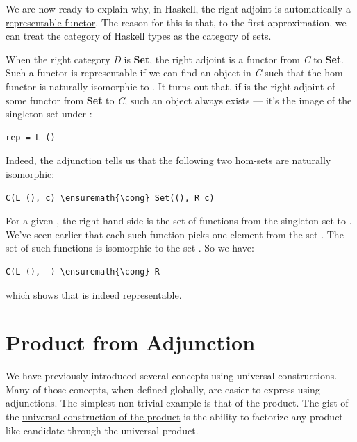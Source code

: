 We are now ready to explain why, in Haskell, the right adjoint is
automatically a \hyperref[chap-representable-functors]{representable
functor}. The reason for this is that, to the first approximation, we
can treat the category of Haskell types as the category of sets.

When the right category \emph{D} is \textbf{Set}, the right adjoint
 is a functor from \emph{C} to \textbf{Set}. Such a functor is
representable if we can find an object  in \emph{C} such
that the hom-functor  is naturally isomorphic to
. It turns out that, if  is the right adjoint of
some functor  from \textbf{Set} to \emph{C}, such an object
always exists --- it's the image of the singleton set \code{()} under
:

\begin{Verbatim}[commandchars=\\\{\}]
rep = L ()
\end{Verbatim}
Indeed, the adjunction tells us that the following two hom-sets are
naturally isomorphic:

\begin{Verbatim}[commandchars=\\\{\}]
C(L (), c) \ensuremath{\cong} Set((), R c)
\end{Verbatim}
For a given , the right hand side is the set of functions from
the singleton set \code{()} to . We've seen earlier that
each such function picks one element from the set . The set
of such functions is isomorphic to the set . So we have:

\begin{Verbatim}[commandchars=\\\{\}]
C(L (), -) \ensuremath{\cong} R
\end{Verbatim}
which shows that  is indeed representable.

\section{Product from Adjunction}\label{product-from-adjunction}

We have previously introduced several concepts using universal
constructions. Many of those concepts, when defined globally, are easier
to express using adjunctions. The simplest non-trivial example is that
of the product. The gist of the \hyperref[products-and-coproducts]{universal
construction of the product} is the ability to factorize any
product-like candidate through the universal product.

